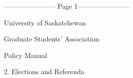 ﻿----------------------- Page 1-----------------------

  

  

  

  

  

                                                         

                                        University of Saskatchewan  

                                                                          

                                Graduate Students’ Association  

  

  

  

  

  

  

  

  

  

  

  

  

  

  

  

  

  

  

  

  

  

  

  

                                                       

                                                     Policy Manual  

  

                                       2. Elections and Referenda  

  

  

  

  

  

  

  

  

  

  

  

